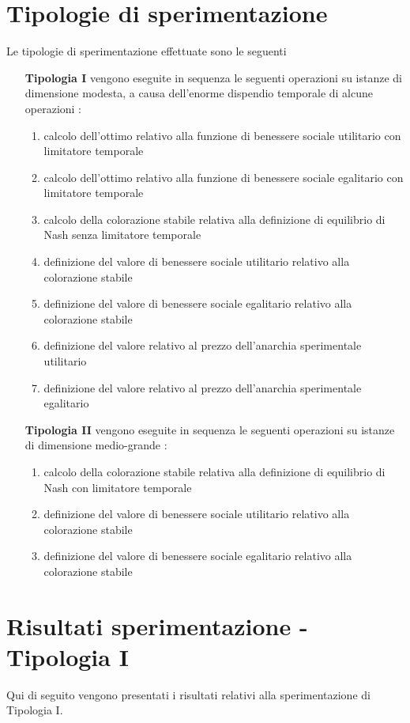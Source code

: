 \section{Tipologie di sperimentazione}
\justify
Le tipologie di sperimentazione effettuate sono le seguenti

\begin{itemize}
	\item [\textbf{Tipologia I}] vengono eseguite in sequenza le seguenti operazioni su istanze di dimensione modesta, a causa dell'enorme dispendio temporale di alcune operazioni :
	\begin{enumerate}
		\item calcolo dell'ottimo relativo alla funzione di benessere sociale utilitario con limitatore temporale
		\item calcolo dell'ottimo relativo alla funzione di benessere sociale egalitario con limitatore temporale
		\item calcolo della colorazione stabile relativa alla definizione di equilibrio di Nash senza limitatore temporale
		\item definizione del valore di benessere sociale utilitario relativo alla colorazione stabile
		\item definizione del valore di benessere sociale egalitario relativo alla colorazione stabile
		\item definizione del valore relativo al prezzo dell'anarchia sperimentale utilitario
		\item definizione del valore relativo al prezzo dell'anarchia sperimentale egalitario
	\end{enumerate}
	\item [\textbf{Tipologia II}] vengono eseguite in sequenza le seguenti operazioni su istanze di dimensione medio-grande :
	\begin{enumerate}
		\item calcolo della colorazione stabile relativa alla definizione di equilibrio di Nash con limitatore temporale
		\item definizione del valore di benessere sociale utilitario relativo alla colorazione stabile
		\item definizione del valore di benessere sociale egalitario relativo alla colorazione stabile
	\end{enumerate}
\end{itemize}

\section{Risultati sperimentazione - Tipologia I}
\justify
Qui di seguito vengono presentati i risultati relativi alla sperimentazione di Tipologia I.\\

